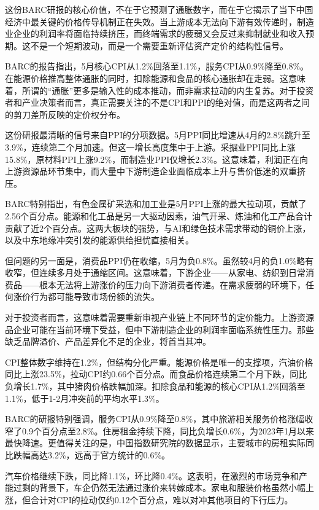 \documentclass[11pt]{ctexart}
\begin{document}
这份BARC研报的核心价值，不在于它预测了通胀数字，而在于它揭示了当下中国经济中最关键的价格传导机制正在失效。当上游成本无法向下游有效传递时，制造业企业的利润率将面临持续挤压，而终端需求的疲弱又会反过来抑制就业和收入预期。这不是一个短期波动，而是一个需要重新评估资产定价的结构性信号。

BARC的报告指出，5月核心CPI从1.2\%回落至1.1\%，服务CPI从0.9\%降至0.8\%。在能源价格推高整体通胀的同时，扣除能源和食品的核心通胀却在走弱。这意味着，所谓的“通胀”更多是输入性的成本推动，而非需求拉动的内生复苏。对于投资者和产业决策者而言，真正需要关注的不是CPI和PPI的绝对值，而是这两者之间的剪刀差所反映的定价权分布。

这份研报最清晰的信号来自PPI的分项数据。5月PPI同比增速从4月的2.8\%跳升至3.9\%，连续第二个月加速。但这一增长高度集中于上游。采掘业PPI同比上涨15.8\%，原材料PPI上涨9.2\%，而制造业PPI仅增长2.3\%。这意味着，利润正在向上游资源品环节集中，而大量中下游制造企业面临成本上升与售价低迷的双重挤压。

BARC特别指出，有色金属矿采选和加工业是5月PPI上涨的最大拉动项，贡献了2.56个百分点。能源和化工品是另一大驱动因素，油气开采、炼油和化工产品合计贡献了近2个百分点。这两大板块的强势，与AI和绿色技术需求带动的铜价上涨，以及中东地缘冲突引发的能源供给担忧直接相关。

但问题的另一面是，消费品PPI仍在收缩，5月为负0.8\%。虽然较4月的负1.0\%略有收窄，但连续多月处于通缩区间。这意味着，下游企业——从家电、纺织到日常消费品——根本无法将上游涨价的压力向下游消费者传递。在需求疲弱的环境下，任何涨价行为都可能导致市场份额的流失。

对于投资者而言，这意味着需要重新审视产业链上不同环节的定价能力。上游资源品企业可能在当前环境下受益，但中下游制造企业的利润率面临系统性压力。那些缺乏品牌溢价、产品差异化不足的企业，将首当其冲。

CPI整体数字维持在1.2\%，但结构分化严重。能源价格是唯一的支撑项，汽油价格同比上涨23.5\%，拉动CPI约0.66个百分点。而食品价格连续第二个月下跌，同比负增长1.7\%，其中猪肉价格跌幅加深。扣除食品和能源的核心CPI从1.2\%回落至1.1\%，低于1-2月冲突前的平均水平1.3\%。

BARC的研报特别强调，服务CPI从0.9\%降至0.8\%，其中旅游相关服务价格涨幅收窄了0.9个百分点至2.8\%。住房租金持续下降，同比负增长0.6\%，为2023年1月以来最快降速。更值得关注的是，中国指数研究院的数据显示，主要城市的房租实际同比跌幅高达3.2\%，远高于官方统计的0.6\%。

汽车价格继续下跌，同比降1.1\%，环比降0.4\%。这表明，在激烈的市场竞争和产能过剩的背景下，车企仍然无法通过涨价来转嫁成本。家电和服装价格虽然小幅上涨，但合计对CPI的拉动仅约0.12个百分点，难以对冲其他项目的下行压力。
\end{document}
